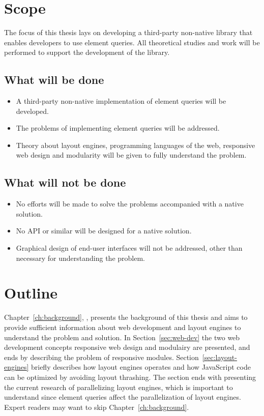 \documentclass[a4paper,11pt]{kth-mag}
\begin{document}
    \section{Scope}
      The focus of this thesis lays on developing a \gls{third-party} non-\gls{native} library that enables developers to use element queries.
      All theoretical studies and work will be performed to support the development of the library.

      \subsection{What will be done}
      \begin{itemize}
      \item A \gls{third-party} non-\gls{native} implementation of element queries will be developed.
      \item The problems of implementing element queries  will be addressed.
      \item Theory about \glspl{layout engine}, programming languages of the \gls{web}, \gls{responsive} \gls{web} design and modularity will be given to fully understand the problem.
      \end{itemize}

      \subsection{What will not be done}
      \begin{itemize}
      \item No efforts will be made to solve the problems accompanied with a \gls{native} solution.
      \item No \gls{API} or similar will be designed for a \gls{native} solution.
      \item Graphical design of end-user interfaces will not be addressed, other than necessary for understanding the problem.
      \end{itemize}
    \section{Outline}
      \newcommand{\chref}[1]{Chapter~\ref{#1}, \emph{\nameref{#1}},}
      \chref{ch:background} presents the background of this thesis and aims to provide sufficient information about \gls{web} development and \glspl{layout engine} to understand the problem and solution.
      In Section~\ref{sec:web-dev} the two \gls{web} development concepts \gls{responsive} \gls{web} design and modulairy are presented, and ends by describing the problem of \gls{responsive} modules.
      Section~\ref{sec:layout-engines} briefly describes how \glspl{layout engine} operates and how \gls{JavaScript} code can be optimized by avoiding \gls{layout thrashing}.
      The section ends with presenting the current research of parallelizing \glspl{layout engine}, which is important to understand since element queries affect the parallelization of \glspl{layout engine}.
      Expert readers may want to skip Chapter~\ref{ch:background}.
\end{document}
